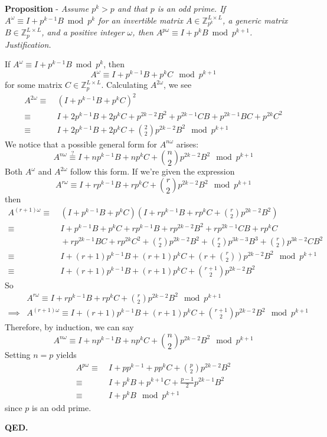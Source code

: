 \documentclass[a4paper, 12pt, reqno]{amsart}
\newcounter{propcounter}
\newenvironment{proposition}[1]
{
	\refstepcounter{propcounter}
	\textbf{Proposition \thepropcounter} - \emph{#1} \\
	\emph{Justification.}
}
{
	\textbf{QED.} \\
}
\begin{document}
		\begin{proposition}{Assume $p^k > p$ and that $p$ is an odd prime. If $A^\omega \equiv I + p^{k-1}B \bmod{p^k}$ for an invertible matrix 
		$A \in \mathds{Z}_{p^k}^{L \times L}$, a generic matrix $B \in \mathds{Z}_p^{L \times L}$, and a positive integer $\omega$, then 
		$A^{p\omega} \equiv I + p^kB \bmod{p^{k+1}}$.}
			\label{prop:liftIterate}
			If $A^\omega \equiv I + p^{k-1}B \bmod{p^k}$, then
			\[
				A^\omega \equiv I + p^{k-1}B + p^kC \mod{p^{k+1}}
			\]
			for some matrix $C \in \mathds{Z}_p^{L \times L}$. Calculating $A^{2\omega}$, we see
			\begin{align*}
				A^{2\omega} \equiv& \ (I + p^{k-1}B + p^kC)^2                                                   \\
							\equiv& \ I + 2p^{k-1}B + 2p^kC + p^{2k-2}B^2 + p^{2k-1}CB + p^{2k-1}BC + p^{2k}C^2 \\
							\equiv& \ I + 2p^{k-1}B + 2p^kC + \binom{2}{2}p^{2k-2}B^2 \mod{p^{k+1}}
			\end{align*}
			We notice that a possible general form for $A^{n\omega}$ arises:
			\[
				A^{n\omega} \overset{?}{\equiv} I + np^{k-1}B + np^kC + \binom{n}{2}p^{2k-2}B^2 \mod{p^{k+1}}
			\]
			Both $A^\omega$ and $A^{2\omega}$ follow this form. If we're given the expression
			\[
				A^{r\omega} \equiv I + rp^{k-1}B + rp^kC + \binom{r}{2}p^{2k-2}B^2 \mod{p^{k+1}}
			\]
			then
			\begin{align*}
				A^{(r+1)\omega} \equiv& \ (I + p^{k-1}B + p^kC)(I + rp^{k-1}B + rp^kC + \binom{r}{2}p^{2k-2}B^2) \\
				                \equiv& \ I + p^{k-1}B + p^kC + rp^{k-1}B + rp^{2k-2}B^2 + rp^{2k-1}CB + rp^kC \\
								      & \ + rp^{2k-1}BC + rp^{2k}C^2 + \binom{r}{2}p^{2k-2}B^2 + \binom{r}{2}p^{3k-3}B^3 + \binom{r}{2}p^{3k-2}CB^2 \\
								\equiv& \ I + (r+1)p^{k-1}B + (r+1)p^kC + \left(r + \binom{r}{2}\right)p^{2k-2}B^2 \mod{p^{k+1}} \\
								\equiv& \ I + (r+1)p^{k-1}B + (r+1)p^kC + \binom{r+1}{2}p^{2k-2}B^2
			\end{align*}
			So
			\begin{align*}
				        & A^{r\omega}     \equiv I + rp^{k-1}B     + rp^kC     + \binom{r}{2}p^{2k-2}B^2   \mod{p^{k+1}} \\
				\implies& A^{(r+1)\omega} \equiv I + (r+1)p^{k-1}B + (r+1)p^kC + \binom{r+1}{2}p^{2k-2}B^2 \mod{p^{k+1}}
			\end{align*}
			Therefore, by induction, we can say
			\[
				A^{n\omega} \equiv I + np^{k-1}B + np^kC + \binom{n}{2}p^{2k-2}B^2 \mod{p^{k+1}}
			\]
			Setting $n=p$ yields
			\begin{align*}
				A^{p\omega} \equiv& \ I + pp^{k-1} + pp^kC + \binom{p}{2}p^{2k-2}B^2 \\
				            \equiv& \ I + p^kB + p^{k+1}C + \frac{p-1}{2}p^{2k-1}B^2 \\
							\equiv& \ I + p^kB \mod{p^{k+1}}
			\end{align*}
			since $p$ is an odd prime.
		\end{proposition}
		
\end{document}

